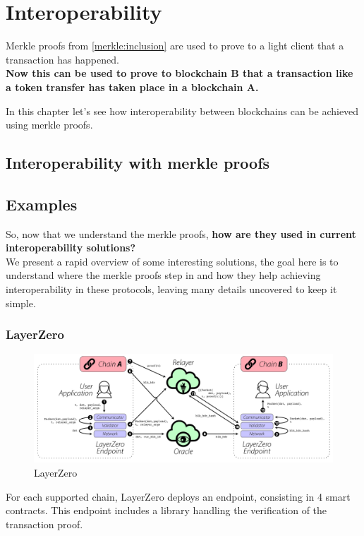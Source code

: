 \chapter{Interoperability}
Merkle proofs from \ref{merkle:inclusion} are used to prove to a light client that a transaction has happened. \\
\textbf{Now this can be used to prove to blockchain B that a transaction like a token transfer has taken place in a blockchain A.}

In this chapter let's see how interoperability between blockchains can be achieved using merkle proofs. 

\section{Interoperability with merkle proofs}

\section{Examples}
So, now that we understand the merkle proofs, \textbf{how are they used in current interoperability solutions?}
\\We present a rapid overview of some interesting solutions, the goal here is to understand where the merkle proofs step in and how they help achieving interoperability in these protocols, leaving many details uncovered to keep it simple.
\subsection{LayerZero}
\begin{figure}[H]
    \centering
\includegraphics[width=1.\linewidth]{interoperability/layerZero.png}
    \caption{LayerZero}
    \label{fig:layer_zero}
\end{figure}

For each supported chain, LayerZero deploys an endpoint, consisting in 4 smart contracts. This endpoint includes a library handling the verification of the transaction proof.

